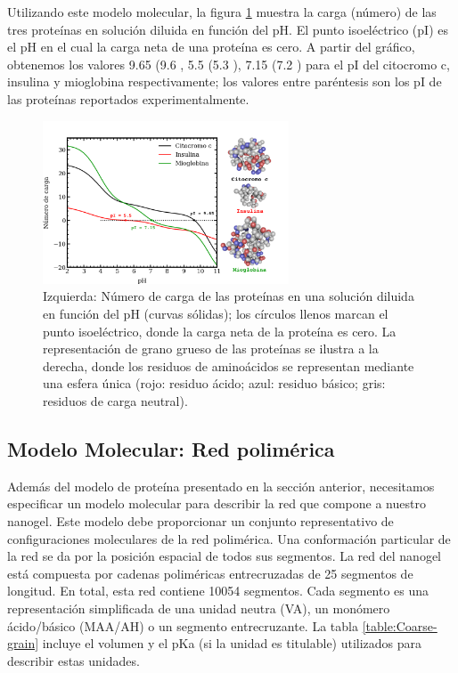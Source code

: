 Utilizando este modelo molecular, la figura \ref{fig:esf:protein-charge} muestra la carga (n\'umero) de las tres prote\'inas en soluci\'on diluida en funci\'on del pH.
El punto isoel\'ectrico (pI) es el pH en el cual la carga neta de una prote\'ina es cero.
A partir del gr\'afico, obtenemos los valores 9.65 (9.6 \cite{hristova2019isoelectric}, 5.5 (5.3 \cite{guckeisen2019isoelectric}), 7.15 (7.2 \cite{batys2020myoglobin}) para el pI del citocromo c, insulina y mioglobina respectivamente;
los valores entre par\'entesis son los pI de las prote\'inas reportados experimentalmente.


 \begin{figure}[!htb]
     \centering
     \includegraphics[width=0.65\textwidth]{Figures/graphs-gel2/protein-model.pdf}
     \caption{Izquierda: N\'umero de carga de las prote\'inas en una soluci\'on diluida en funci\'on del pH (curvas s\'olidas);
     	los c\'irculos llenos marcan el punto isoel\'ectrico,
     	donde la carga neta de la prote\'ina es cero.
     	La representaci\'on de grano grueso de las prote\'inas se ilustra a la derecha, donde los residuos de amino\'acidos se representan mediante una esfera \'unica (rojo: residuo \'acido; azul: residuo b\'asico; gris: residuos de carga neutral).}
     \label{fig:esf:protein-charge}
 \end{figure}



\subsection{Modelo Molecular: Red polim\'erica}

Adem\'as del modelo de prote\'ina presentado en la secci\'on anterior, necesitamos especificar un modelo molecular para describir la red que compone a nuestro nanogel. Este modelo debe proporcionar un conjunto representativo de configuraciones moleculares de la red polim\'erica. Una conformaci\'on particular de la red se da por la posici\'on espacial de todos sus segmentos.
La red del nanogel est\'a compuesta por cadenas polim\'ericas entrecruzadas de 25 segmentos de longitud. En total, esta red contiene 10054 segmentos. Cada segmento es una representaci\'on simplificada de una unidad neutra (VA), un mon\'omero \'acido/b\'asico (MAA/AH) o un segmento entrecruzante. La tabla \ref{table:Coarse-grain} incluye el volumen y el pKa (si la unidad es titulable) utilizados para describir estas unidades.

